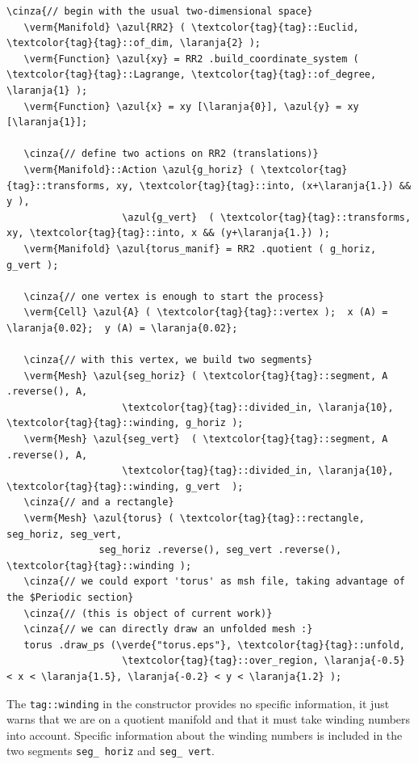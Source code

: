 \begin{Verbatim}[commandchars=\\\{\},formatcom=\small\tt,frame=single,
   label=parag-\ref{\numb section 7.\numb parag 4}.cpp,rulecolor=\color{moldura},
   baselinestretch=0.94,framesep=2mm                                            ]
   \cinza{// begin with the usual two-dimensional space}
   \verm{Manifold} \azul{RR2} ( \textcolor{tag}{tag}::Euclid, \textcolor{tag}{tag}::of_dim, \laranja{2} );
   \verm{Function} \azul{xy} = RR2 .build_coordinate_system ( \textcolor{tag}{tag}::Lagrange, \textcolor{tag}{tag}::of_degree, \laranja{1} );
   \verm{Function} \azul{x} = xy [\laranja{0}], \azul{y} = xy [\laranja{1}];

   \cinza{// define two actions on RR2 (translations)}
   \verm{Manifold}::Action \azul{g_horiz} ( \textcolor{tag}{tag}::transforms, xy, \textcolor{tag}{tag}::into, (x+\laranja{1.}) && y ),
                    \azul{g_vert}  ( \textcolor{tag}{tag}::transforms, xy, \textcolor{tag}{tag}::into, x && (y+\laranja{1.}) );
   \verm{Manifold} \azul{torus_manif} = RR2 .quotient ( g_horiz, g_vert );

   \cinza{// one vertex is enough to start the process}
   \verm{Cell} \azul{A} ( \textcolor{tag}{tag}::vertex );  x (A) = \laranja{0.02};  y (A) = \laranja{0.02};

   \cinza{// with this vertex, we build two segments}
   \verm{Mesh} \azul{seg_horiz} ( \textcolor{tag}{tag}::segment, A .reverse(), A,
                    \textcolor{tag}{tag}::divided_in, \laranja{10}, \textcolor{tag}{tag}::winding, g_horiz );
   \verm{Mesh} \azul{seg_vert}  ( \textcolor{tag}{tag}::segment, A .reverse(), A,
                    \textcolor{tag}{tag}::divided_in, \laranja{10}, \textcolor{tag}{tag}::winding, g_vert  );
   \cinza{// and a rectangle}
   \verm{Mesh} \azul{torus} ( \textcolor{tag}{tag}::rectangle, seg_horiz, seg_vert,
                seg_horiz .reverse(), seg_vert .reverse(), \textcolor{tag}{tag}::winding );
   \cinza{// we could export 'torus' as msh file, taking advantage of the $Periodic section}
   \cinza{// (this is object of current work)}
   \cinza{// we can directly draw an unfolded mesh :}
   torus .draw_ps (\verde{"torus.eps"}, \textcolor{tag}{tag}::unfold,
                    \textcolor{tag}{tag}::over_region, \laranja{-0.5} < x < \laranja{1.5}, \laranja{-0.2} < y < \laranja{1.2} );
\end{Verbatim}

The {\small\tt\textcolor{tag}{tag}::winding} in the constructor {\small\tt{}}
{\small\tt{}} provides no specific information, it just warns {\maniFEM} that
we are on a quotient manifold and that it must take winding numbers into account.
Specific information about the winding numbers is included in the two segments
{\small\tt seg\_\,horiz} and {\small\tt seg\_\,vert}.

